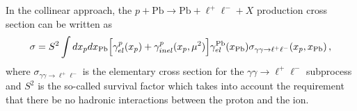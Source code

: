 In the collinear approach, the $p+\textrm{Pb}\rightarrow \textrm{Pb} + \ell^+\ell^- + X$ production cross section can be written as
%
\begin{equation}
\sigma 
= S^2 \int dx_p dx_{\rm Pb} 
\Big [ \gamma^{p}_{el}(x_p) + \gamma^{p}_{inel}(x_p,\mu^2) \Big]
 \gamma^{\rm Pb}_{el}(x_{\rm Pb})
\sigma_{\gamma \gamma \rightarrow \ell^+ \ell^-}(x_p, x_{\rm Pb}) \,,
\label{collinear_factorization_formula}
\end{equation}
%
where $\sigma_{\gamma \gamma \rightarrow \ell^+ \ell^-}$
is the elementary cross section for the $\gamma \gamma \rightarrow \ell^+ \ell^-$ subprocess and $S^2$ is the so-called survival factor which takes into account the requirement that there be no hadronic interactions between the proton and the ion.

